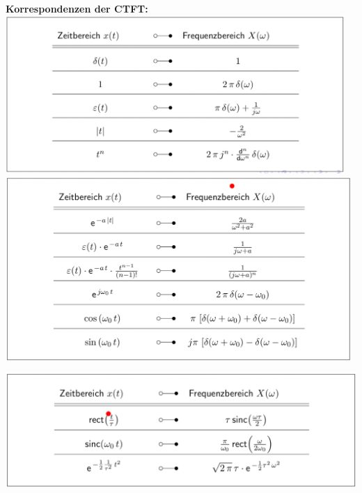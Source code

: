 \documentclass[12pt,a4paper]{scrartcl}
\begin{document}
  \noindent \textbf{Korrespondenzen der CTFT:} \\
  \includegraphics[height = 6cm]{Pictures/Korrespondenz.png}\\
  \includegraphics[height = 7cm]{Pictures/Korrespondenz2.png}\\
  \includegraphics[height = 5cm]{Pictures/Korrespondenz3.png}
\end{document}
